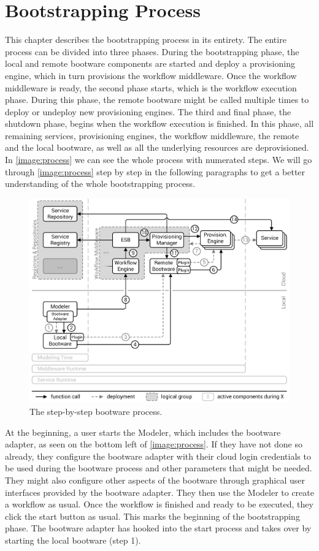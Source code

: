\chapter{Bootstrapping Process}
\label{process}

This chapter describes the bootstrapping process in its entirety.
The entire process can be divided into three phases.
During the bootstrapping phase, the local and remote bootware components are started and deploy a provisioning engine, which in turn provisions the workflow middleware.
Once the workflow middleware is ready, the second phase starts, which is the workflow execution phase.
During this phase, the remote bootware might be called multiple times to deploy or undeploy new provisioning engines.
The third and final phase, the shutdown phase, begins when the workflow execution is finished.
In this phase, all remaining services, provisioning engines, the workflow middleware, the remote and the local bootware, as well as all the underlying resources are deprovisioned.
In \autoref{image:process} we can see the whole process with numerated steps.
We will go through \autoref{image:process} step by step in the following paragraphs to get a better understanding of the whole bootstrapping process.

\begin{figure}[!htbp]
	\centering
	\includegraphics[resolution=600]{process/assets/process}
	\caption{The step-by-step bootware process.}
	\label{image:process}
\end{figure}

At the beginning, a user starts the Modeler, which includes the bootware adapter, as seen on the bottom left of \autoref{image:process}.
If they have not done so already, they configure the bootware adapter with their cloud login credentials to be used during the bootware process and other parameters that might be needed. They might also configure other aspects of the bootware through graphical user interfaces provided by the bootware adapter.
They then use the Modeler to create a workflow as usual.
Once the workflow is finished and ready to be executed, they click the start button as usual.
This marks the beginning of the bootstrapping phase.
The bootware adapter has hooked into the start process and takes over by starting the local bootware (step 1).


